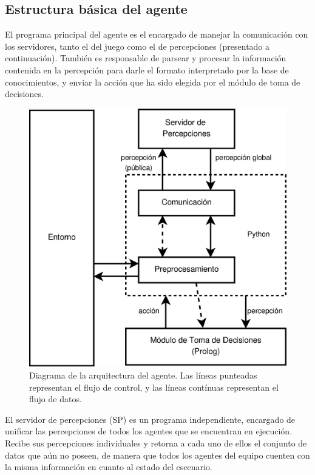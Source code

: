 \documentclass[oneside]{book}
\theoremstyle{definition}
\theoremstyle{example}
\begin{document}
\subsection{Estructura básica del agente}


El programa principal del agente es el encargado de manejar la comunicación con los 
servidores, tanto el del juego como el de percepciones (presentado 
a continuación). También es responsable de parsear y procesar la información contenida 
en la percepción para darle el formato interpretado por la base de conocimientos, y 
enviar la acción que ha sido elegida por el módulo de toma de decisiones.

\begin{figure}
 \centering
\includegraphics[scale=.4]{agent_architecture.eps}

 \caption{Diagrama de la arquitectura del agente. Las líneas punteadas representan el 
 flujo de control, y las líneas contínuas representan el flujo de datos.}
 \label{fig:architecture}
\end{figure}

El servidor de percepciones (SP) es un programa independiente, encargado de unificar las 
percepciones de todos los agentes que se encuentran en ejecución. Recibe sus percepciones 
individuales y retorna a cada uno de ellos el conjunto de datos que aún no poseen, de 
manera que todos los agentes del equipo cuenten con la misma información en cuanto al estado 
del escenario.
\end{document}
